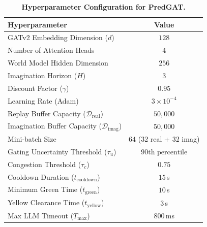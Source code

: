 \documentclass[11pt,a4paper,twocolumn]{article}
\begin{document}
\begin{table}[h]
\centering
\small
\caption{\textbf{Hyperparameter Configuration for PredGAT.}}
\label{tab:hyperparams}
\begin{tabular}{lc}
\toprule
\textbf{Hyperparameter} & \textbf{Value} \\
\midrule
GATv2 Embedding Dimension ($d$) & $128$ \\
Number of Attention Heads & $4$ \\
World Model Hidden Dimension & $256$ \\
Imagination Horizon ($H$) & $3$ \\
Discount Factor ($\gamma$) & $0.95$ \\
Learning Rate (Adam) & $3 \times 10^{-4}$ \\
Replay Buffer Capacity ($\mathcal{D}_{\text{real}}$) & $50,000$ \\
Imagination Buffer Capacity ($\mathcal{D}_{\text{imag}}$) & $50,000$ \\
Mini-batch Size & $64$ (32 real + 32 imag) \\
Gating Uncertainty Threshold ($\tau_u$) & $90\text{th percentile}$ \\
Congestion Threshold ($\tau_c$) & $0.75$ \\
Cooldown Duration ($t_{\text{cooldown}}$) & $15$\,s \\
Minimum Green Time ($t_{\text{green}}$) & $10$\,s \\
Yellow Clearance Time ($t_{\text{yellow}}$) & $3$\,s \\
Max LLM Timeout ($T_{\text{max}}$) & $800$\,ms \\
\bottomrule
\end{tabular}
\end{table}
\end{document}
